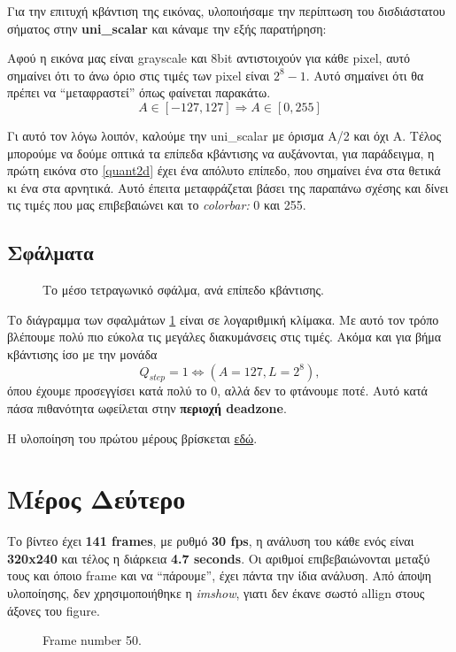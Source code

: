 \documentclass[11pt]{scrartcl} %
\begin{document}
Για την επιτυχή κβάντιση της εικόνας, υλοποιήσαμε την περίπτωση του δισδιάστατου σήματος στην \textbf{uni\_scalar} και κάναμε την εξής παρατήρηση:

Αφού η εικόνα μας είναι grayscale και 8bit αντιστοιχούν για κάθε pixel, αυτό σημαίνει ότι το άνω όριο στις τιμές των pixel είναι $2^8-1$.
Αυτό σημαίνει ότι θα πρέπει να ``μεταφραστεί'' όπως φαίνεται παρακάτω.
\[
A\in [-127, 127] \Rightarrow
\boxed{A\in [0, 255]}
\]

Γι αυτό τον λόγω λοιπόν, καλούμε την uni\_scalar με όρισμα Α/2 και όχι Α. Τέλος μπορούμε να δούμε οπτικά τα επίπεδα κβάντισης να αυξάνονται, για παράδειγμα,
η πρώτη εικόνα στο \ref{quant2d} έχει ένα απόλυτο επίπεδο, που σημαίνει ένα στα θετικά κι ένα στα αρνητικά. Αυτό έπειτα μεταφράζεται βάσει της παραπάνω σχέσης
και δίνει τις τιμές που μας επιβεβαιώνει και το \textit{colorbar:} 0 και 255.

\subsection{Σφάλματα}
\begin{figure}[h]
    \centering
    \caption{Το μέσο τετραγωνικό σφάλμα, ανά επίπεδο κβάντισης.}
    \label{mse}
\end{figure}
\clearpage

Το διάγραμμα των σφαλμάτων \ref{mse} είναι σε λογαριθμική κλίμακα. Με αυτό τον τρόπο βλέπουμε πολύ πιο εύκολα τις μεγάλες διακυμάνσεις στις τιμές. Ακόμα και για
βήμα κβάντισης ίσο με την μονάδα \textbf{$$Q_{step}=1 \Leftrightarrow (A=127, L=2^8),$$} όπου έχουμε προσεγγίσει κατά πολύ το 0, αλλά δεν το φτάνουμε ποτέ. Αυτό κατά πάσα
πιθανότητα ωφείλεται στην \textbf{περιοχή deadzone}.

Η υλοποίηση του πρώτου μέρους βρίσκεται \hyperlink{partA}{εδώ}.

\section{Μέρος Δεύτερο}

Το βίντεο έχει \textbf{141 frames}, με ρυθμό \textbf{30 fps}, η ανάλυση του κάθε ενός είναι \textbf{320x240} και τέλος η διάρκεια \textbf{4.7 seconds}. Οι αριθμοί επιβεβαιώνονται
μεταξύ τους και όποιο frame και να ``πάρουμε'', έχει πάντα την ίδια ανάλυση. Από άποψη υλοποίησης, δεν χρησιμοποιήθηκε η \textit{imshow}, γιατι δεν έκανε σωστό allign στους άξονες
του figure.
\begin{figure}[h]
    \centering
    \caption{Frame number 50.}
    \label{50}
\end{figure}
\end{document}
